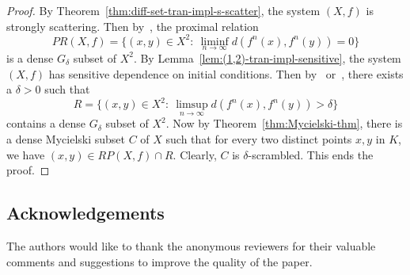 \documentclass[12pt,a4paper]{amsart}
\theoremstyle{definition}
\numberwithin{equation}{section}
\begin{document}
\begin{proof}
By Theorem~\ref{thm:diff-set-tran-impl-s-scatter}, the system $(X,f)$ is strongly scattering.
Then by~\cite[Theorem~3]{W-Huang-X-Ye-2002}, the proximal relation
\[PR(X,f)=\{(x,y)\in X^2:\ \liminf_{n\to\infty} d(f^n(x),f^n(y))=0\}\]
is a dense $G_\delta$ subset of $X^2$.
By Lemma~\ref{lem:(1,2)-tran-impl-sensitive}, the system $(X,f)$ has sensitive dependence on initial conditions.
Then by~\cite[Asymptotic Theorem]{W-Huang-X-Ye-2002} or~\cite[Theorem 3.4]{AK03},
there exists a $\delta>0$ such that
\[R=\{(x,y)\in X^2:\ \limsup_{n\to\infty} d(f^n(x),f^n(y))>\delta\}\]
contains a dense $G_\delta$ subset of $X^2$.
Now by Theorem~\ref{thm:Mycielski-thm}, there is a dense Mycielski subset $C$ of $X$ such that
for every two distinct points $x,y$ in $K$, we have $(x,y)\in RP(X,f)\cap R$.
Clearly, $C$ is $\delta$-scrambled. This ends the proof.
\end{proof}

\subsection*{Acknowledgements}
The authors would like to thank the anonymous reviewers for
their valuable comments and suggestions to improve the
quality of the paper.
\end{document}
